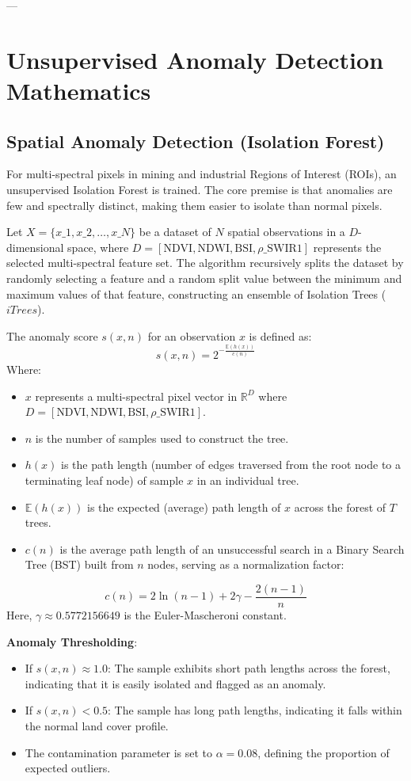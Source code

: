 ---

\section{Unsupervised Anomaly Detection Mathematics}

\subsection{Spatial Anomaly Detection (Isolation Forest)}
For multi-spectral pixels in mining and industrial Regions of Interest (ROIs), an unsupervised Isolation Forest is trained. The core premise is that anomalies are few and spectrally distinct, making them easier to isolate than normal pixels.

Let $X = \{x\_1, x\_2, \dots, x\_N\}$ be a dataset of $N$ spatial observations in a $D$-dimensional space, where $D = [\text{NDVI}, \text{NDWI}, \text{BSI}, \rho\_{\text{SWIR1}}]$ represents the selected multi-spectral feature set. The algorithm recursively splits the dataset by randomly selecting a feature and a random split value between the minimum and maximum values of that feature, constructing an ensemble of Isolation Trees ($iTrees$).

The anomaly score $s(x, n)$ for an observation $x$ is defined as:
$$s(x, n) = 2^{-\frac{\mathbb{E}(h(x))}{c(n)}}$$
Where:
\begin{itemize}
  \item $x$ represents a multi-spectral pixel vector in $\mathbb{R}^D$ where $D = [\text{NDVI}, \text{NDWI}, \text{BSI}, \rho\_{\text{SWIR1}}]$.
  \item $n$ is the number of samples used to construct the tree.
  \item $h(x)$ is the path length (number of edges traversed from the root node to a terminating leaf node) of sample $x$ in an individual tree.
  \item $\mathbb{E}(h(x))$ is the expected (average) path length of $x$ across the forest of $T$ trees.
  \item $c(n)$ is the average path length of an unsuccessful search in a Binary Search Tree (BST) built from $n$ nodes, serving as a normalization factor:
\end{itemize}
$$c(n) = 2\ln(n - 1) + 2\gamma - \frac{2(n - 1)}{n}$$
Here, $\gamma \approx 0.5772156649$ is the Euler-Mascheroni constant.

\textbf{Anomaly Thresholding}:
\begin{itemize}
  \item If $s(x, n) \approx 1.0$: The sample exhibits short path lengths across the forest, indicating that it is easily isolated and flagged as an anomaly.
  \item If $s(x, n) < 0.5$: The sample has long path lengths, indicating it falls within the normal land cover profile.
  \item The contamination parameter is set to $\alpha = 0.08$, defining the proportion of expected outliers.

\end{itemize}
